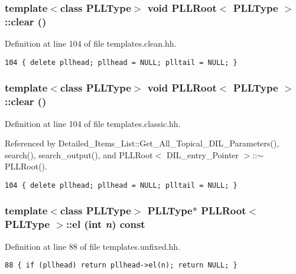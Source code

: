 \subsubsection{\setlength{\rightskip}{0pt plus 5cm}template$<$class PLLType$>$ void PLLRoot$<$ {\bf PLLType} $>$::clear ()\hspace{0.3cm}{\tt  [inline]}}\label{classPLLRoot_a33}




Definition at line 104 of file templates.clean.hh.



\footnotesize\begin{verbatim}104 { delete pllhead; pllhead = NULL; plltail = NULL; }
\end{verbatim}\normalsize 
{}
\subsubsection{\setlength{\rightskip}{0pt plus 5cm}template$<$class PLLType$>$ void PLLRoot$<$ {\bf PLLType} $>$::clear ()\hspace{0.3cm}{\tt  [inline]}}\label{classPLLRoot_a16}




Definition at line 104 of file templates.classic.hh.

Referenced by Detailed\_\-Items\_\-List::Get\_\-All\_\-Topical\_\-DIL\_\-Parameters(), search(), search\_\-output(), and PLLRoot$<$ DIL\_\-entry\_\-Pointer $>$::$\sim$PLLRoot().



\footnotesize\begin{verbatim}104 { delete pllhead; pllhead = NULL; plltail = NULL; }
\end{verbatim}\normalsize 
{}
\subsubsection{\setlength{\rightskip}{0pt plus 5cm}template$<$class PLLType$>$ {\bf PLLType}$\ast$ PLLRoot$<$ {\bf PLLType} $>$::el (int {\em n}) const\hspace{0.3cm}{\tt  [inline]}}\label{classPLLRoot_a55}




Definition at line 88 of file templates.unfixed.hh.



\footnotesize\begin{verbatim}88 { if (pllhead) return pllhead->el(n); return NULL; } 
\end{verbatim}\normalsize 
{}
